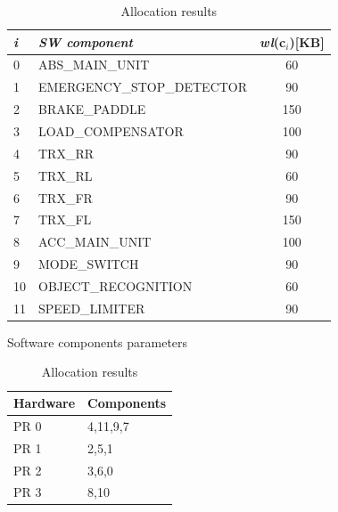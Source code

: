\documentclass[3p,times,procedia,authoryear,round]{elsarticle}
\begin{document}
\begin{table}[!htb]
	
	\begin{minipage}{.5\linewidth}
		
		\centering
		
	\begin{tabular}{ l l  c }
		
		\hline
		\emph{i }& \emph{SW component }&  \emph{wl}(c$_{i}$)[KB] \\ 
		\hline
		0 & ABS\_MAIN\_UNIT& 60 \\
		1 & EMERGENCY\_STOP\_DETECTOR& 90 \\
		2 & BRAKE\_PADDLE& 150 \\
		3 & LOAD\_COMPENSATOR& 100 \\
		4 & TRX\_RR& 90 \\	
		5 & TRX\_RL& 60 \\
		6 & TRX\_FR& 90 \\
		7 & TRX\_FL& 150 \\
		8 & ACC\_MAIN\_UNIT& 100 \\
		9 & MODE\_SWITCH& 90 \\		
		10 & OBJECT\_RECOGNITION& 60 \\
		11 & SPEED\_LIMITER& 90 \\					
		\hline	
	\end{tabular}
	\caption{Software components parameters}
	\label{swparam}
		
	\end{minipage}%
	\begin{minipage}{.6\linewidth}
		\centering
		
		
			\begin{tabular}{ l m{3cm} }
				
				\hline
				Hardware &  Components \\ 
				\hline
			PR 0 & 4,11,9,7\\
            PR 1 & 2,5,1\\				
            PR 2 & 3,6,0\\
            PR 3 & 8,10\\
				
				\hline	
			\end{tabular}
			\normalsize
			
			\caption{Allocation results}
			\label{topoc}
		
		
		
		
	\end{minipage} 
\end{table}
\end{document}
